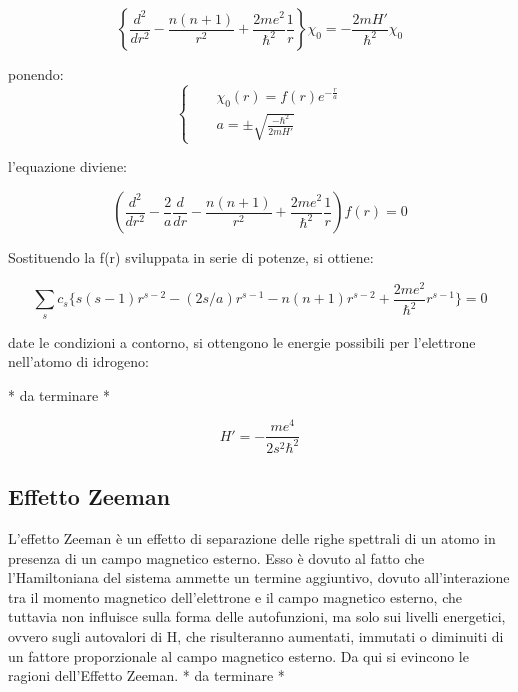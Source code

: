 \documentclass{article}
\begin{document}
\begin{equation}
  \left\{\frac{d^2}{dr^2} -\frac{n(n+1)}{r^2} +\frac{2me^2}{\hbar^2}\frac{1}{r} \right\}\chi_0= -\frac{2mH'}{\hbar^2}\chi_0
\end{equation}

ponendo:
\begin{equation}
  \left\{
  \begin{aligned}
     &  & \chi_0(r)=f(r)e^{-\frac{r}{a}}     \\
     &  & a=\pm \sqrt{\frac{-\hbar^2}{2mH'}}
  \end{aligned}
  \right.
\end{equation}

l'equazione diviene:

\begin{equation}
  \left(\frac{d^2}{dr^2} -\frac{2}{a}\frac{d}{dr} -\frac{n(n+1)}{r^2} +\frac{2me^2}{\hbar^2}\frac{1}{r}\right)f(r)=0
\end{equation}

Sostituendo la f(r) sviluppata in serie di potenze, si ottiene:

\begin{equation}
  \sum_{s} c_s \{s(s-1)r^{s-2}-(2s/a)r^{s-1}-n(n+1)r^{s-2}+\frac{2me^2}{\hbar^2}r^{s-1} \}=0
\end{equation}

date le condizioni a contorno, si ottengono le energie possibili per l'elettrone nell'atomo di idrogeno:

* da terminare *

\begin{equation}
  H'=-\frac{me^4}{2s^2\hbar^2}
\end{equation}

\subsection{Effetto Zeeman}
L'effetto Zeeman è un effetto di separazione delle righe spettrali di un atomo in presenza di un campo magnetico esterno.
Esso è dovuto al fatto che l'Hamiltoniana del sistema ammette un termine aggiuntivo, dovuto all'interazione tra il momento magnetico dell'elettrone e il campo magnetico esterno,
che tuttavia non influisce sulla forma delle autofunzioni, ma solo sui livelli energetici, ovvero sugli autovalori di H,
che risulteranno aumentati, immutati o diminuiti di un fattore proporzionale al campo magnetico esterno.
Da qui si evincono le ragioni dell'Effetto Zeeman.
* da terminare *
\end{document}
